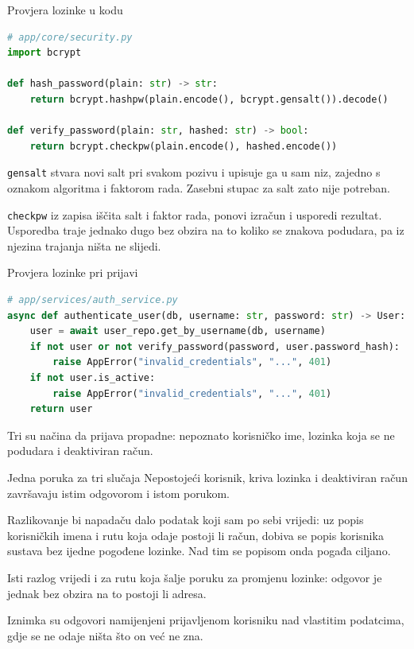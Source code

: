 \begin{frame}[fragile]{Provjera lozinke u kodu}
\begin{lstlisting}[language=python]
# app/core/security.py
import bcrypt

def hash_password(plain: str) -> str:
    return bcrypt.hashpw(plain.encode(), bcrypt.gensalt()).decode()

def verify_password(plain: str, hashed: str) -> bool:
    return bcrypt.checkpw(plain.encode(), hashed.encode())
\end{lstlisting}

\vspace{0.4em}
\texttt{gensalt} stvara novi salt pri svakom pozivu i upisuje ga u sam niz, zajedno s oznakom algoritma i faktorom rada. Zasebni stupac za salt zato nije potreban.

\vspace{1.1em}
\texttt{checkpw} iz zapisa iščita salt i faktor rada, ponovi izračun i usporedi rezultat. Usporedba traje jednako dugo bez obzira na to koliko se znakova podudara, pa iz njezina trajanja ništa ne slijedi.
\end{frame}

\begin{frame}[fragile]{Provjera lozinke pri prijavi}
\begin{lstlisting}[language=python]
# app/services/auth_service.py
async def authenticate_user(db, username: str, password: str) -> User:
    user = await user_repo.get_by_username(db, username)
    if not user or not verify_password(password, user.password_hash):
        raise AppError("invalid_credentials", "...", 401)
    if not user.is_active:
        raise AppError("invalid_credentials", "...", 401)
    return user
\end{lstlisting}

\vspace{0.6em}
Tri su načina da prijava propadne: nepoznato korisničko ime, lozinka koja se ne podudara i deaktiviran račun.
\end{frame}

\begin{frame}{Jedna poruka za tri slučaja}
Nepostojeći korisnik, kriva lozinka i deaktiviran račun završavaju istim odgovorom i istom porukom.

\vspace{1.1em}
Razlikovanje bi napadaču dalo podatak koji sam po sebi vrijedi: uz popis korisničkih imena i rutu koja odaje postoji li račun, dobiva se popis korisnika sustava bez ijedne pogođene lozinke. Nad tim se popisom onda pogađa ciljano.

\vspace{1.1em}
Isti razlog vrijedi i za rutu koja šalje poruku za promjenu lozinke: odgovor je jednak bez obzira na to postoji li adresa.

\vspace{1.1em}
Iznimka su odgovori namijenjeni prijavljenom korisniku nad vlastitim podatcima, gdje se ne odaje ništa što on već ne zna.
\end{frame}

